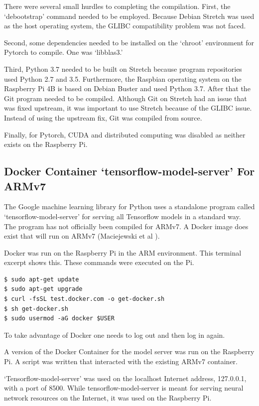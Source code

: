 There were several small hurdles to completing the compilation. First, the `debootstrap' command needed to be employed. Because Debian Stretch was used as the host operating system, the GLIBC compatibility problem was not faced. 

Second, some dependencies needed to be installed on the `chroot' environment for Pytorch to compile. One was `libblas3.'

Third, Python 3.7 needed to be built on Stretch because program repositories used Python 2.7 and 3.5. Furthermore, the Raspbian operating system on the Raspberry Pi 4B is based on Debian Buster and used Python 3.7. After that the Git program needed to be compiled. Although Git on Stretch had an issue that was fixed upstream, it was important to use Stretch because of the GLIBC issue. Instead of using the upstream fix, Git was compiled from source. 

Finally, for Pytorch, CUDA and distributed computing was disabled as neither exists on the Raspberry Pi.

\subsection{Docker Container `tensorflow-model-server' For ARMv7}
The Google machine learning library for Python uses a standalone program called `tensorflow-model-server' for serving all Tensorflow models in a standard way. The program has not officially been compiled for ARMv7. A Docker image does exist that will run on ARMv7 (Maciejewski et al \cite{2020Maciejewski}).

Docker was run on the Raspberry Pi in the ARM environment. This terminal excerpt shows this. These commands were executed on the Pi.

\begin{verbatim}
$ sudo apt-get update
$ sudo apt-get upgrade
$ curl -fsSL test.docker.com -o get-docker.sh 
$ sh get-docker.sh
$ sudo usermod -aG docker $USER
\end{verbatim}

To take advantage of Docker one needs to log out and then log in again.

A version of the Docker Container for the model server was run on the Raspberry Pi. A script was written that interacted with the existing ARMv7 container. %

`Tensorflow-model-server' was used on the localhost Internet address, 127.0.0.1, with a port of 8500. While tensorflow-model-server is meant for serving neural network resources on the Internet, it was used on the Raspberry Pi.


